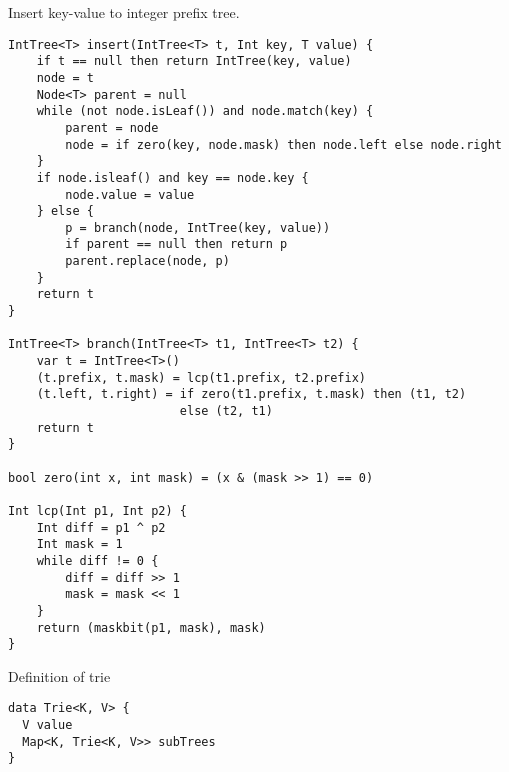 \documentclass[b5paper]{article}
\begin{document}
Insert key-value to integer prefix tree.

\begin{lstlisting}[language = Bourbaki]
IntTree<T> insert(IntTree<T> t, Int key, T value) {
    if t == null then return IntTree(key, value)
    node = t
    Node<T> parent = null
    while (not node.isLeaf()) and node.match(key) {
        parent = node
        node = if zero(key, node.mask) then node.left else node.right
    }
    if node.isleaf() and key == node.key {
        node.value = value
    } else {
        p = branch(node, IntTree(key, value))
        if parent == null then return p
        parent.replace(node, p)
    }
    return t
}

IntTree<T> branch(IntTree<T> t1, IntTree<T> t2) {
    var t = IntTree<T>()
    (t.prefix, t.mask) = lcp(t1.prefix, t2.prefix)
    (t.left, t.right) = if zero(t1.prefix, t.mask) then (t1, t2)
                        else (t2, t1)
    return t
}

bool zero(int x, int mask) = (x & (mask >> 1) == 0)

Int lcp(Int p1, Int p2) {
    Int diff = p1 ^ p2
    Int mask = 1
    while diff != 0 {
        diff = diff >> 1
        mask = mask << 1
    }
    return (maskbit(p1, mask), mask)
}
\end{lstlisting}


Definition of trie

\begin{lstlisting}[language = Bourbaki]
data Trie<K, V> {
  V value
  Map<K, Trie<K, V>> subTrees
}
\end{lstlisting}
\end{document}
